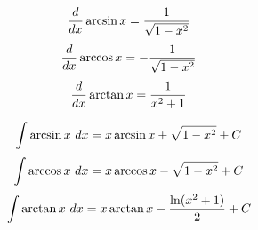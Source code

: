 \documentclass[../main.tex]{subfile}
\begin{document}
\begin{figure}[h]
\centering
\large
\begin{minipage}{0.49\linewidth}
	$$\frac{d}{d x}\arcsin x = \frac{1}{\sqrt{1 - x^2}}$$
	\vspace{0.5em}
	$$\frac{d}{d x}\arccos x = -\frac{1}{\sqrt{1 - x^2}}$$
	\vspace{0.5em}
	$$\frac{d}{d x}\arctan x = \frac{1}{x^2 + 1}$$
\end{minipage}\hfill
\begin{minipage}{0.49\linewidth}
	$$\int \arcsin x \ d x = x \arcsin x + \sqrt{1 - x^2} + C$$
	\vspace{0.5em}
	$$\int \arccos x \ d x = x \arccos x - \sqrt{1 - x^2} + C$$
	\vspace{0.5em}
	$$\int \arctan x \ d x = x \arctan x - \frac{\ln(x^2 + 1)}{2} + C$$
\end{minipage}
\end{figure}

\newpage

\vspace{-2.5em}


\vspace{-1em}
\end{document}
